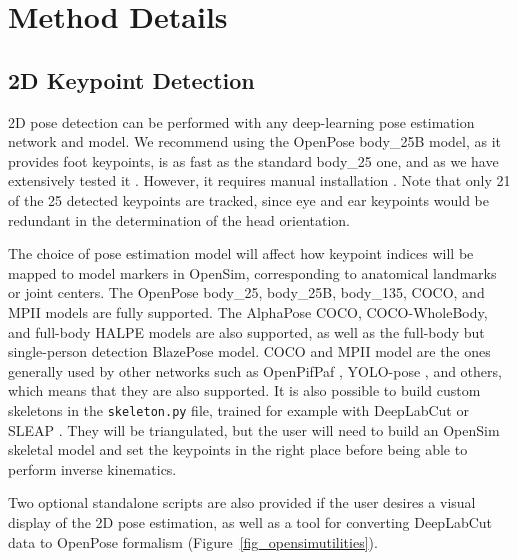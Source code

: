 \clearpage
\section{Method Details}\label{methods_details}
\subsection{2D Keypoint Detection}

2D pose detection can be performed with any deep-learning pose estimation network and model. We recommend using the OpenPose body\_25B model, as it provides foot keypoints, is as fast as the standard body\_25 one, and as we have extensively tested it \cite{Pagnon2022a}. However, it requires manual installation \cite{Hidalgo2021}. Note that only 21 of the 25 detected keypoints are tracked, since eye and ear keypoints would be redundant in the determination of the head orientation. 

The choice of pose estimation model will affect how keypoint indices will be mapped to model markers in OpenSim, corresponding to anatomical landmarks or joint centers. The OpenPose body\_25, body\_25B, body\_135, COCO, and MPII models are fully supported. The AlphaPose COCO, COCO-WholeBody, and full-body HALPE models are also supported, as well as the full-body but single-person detection BlazePose model. COCO and MPII model are the ones generally used by other networks such as OpenPifPaf \cite{Kreiss2021}, YOLO-pose \cite{Maji2022, Wang2022b}, and others, which means that they are also supported. It is also possible to build custom skeletons in the \texttt{skeleton.py} file, trained for example with DeepLabCut \cite{Mathis2018, Lauer2022} or SLEAP \cite{Pereira2022}. They will be triangulated, but the user will need to build an OpenSim skeletal model and set the keypoints in the right place before being able to perform inverse kinematics.


Two optional standalone scripts are also provided if the user desires a visual display of the 2D pose estimation, as well as a tool for converting DeepLabCut data to OpenPose formalism (Figure~\ref{fig_opensimutilities}).


